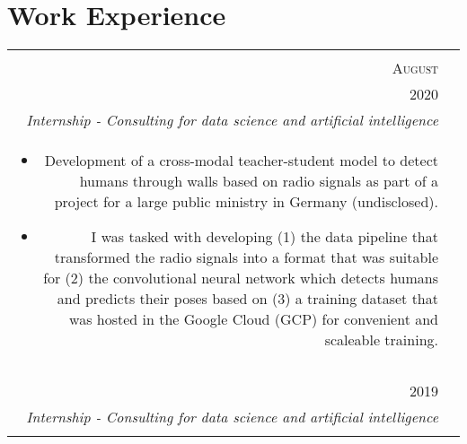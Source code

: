 \documentclass[a4paper,10pt]{article}
\begin{document}
\section{Work Experience}
\begin{tabularx}{\textwidth}{ r | X }

  \begin{tabular}{r}
      \textsc{July \&} \\
      \textsc{August} \\
      \textsc{2020}
  \end{tabular} &

  \begin{tabular}{p{}}
    \textsc{Atos} \\
    \emph{Internship - Consulting for data science and artificial intelligence} \\
    \vspace{-2mm}
    \begin{itemize}[leftmargin=*]

      \item Development of a cross-modal teacher-student model to detect
          humans through walls based on radio signals as part of a project for
          a large public ministry in Germany (undisclosed).

      \item I was tasked with developing (1) the data pipeline that
          transformed the radio signals into a format that was suitable for
          (2) the convolutional neural network which detects humans and
          predicts their poses based on (3) a training dataset that was hosted
          in the Google Cloud (GCP) for convenient and scaleable training.

    \end{itemize}
  \end{tabular}
  \vspace{-6mm} \\
  \multicolumn{2}{c}{} \\

  \begin{tabular}{r}
      \textsc{September} \\
      \textsc{2019}
  \end{tabular} &

  \begin{tabular}{p{}}
    \textsc{Atos} \\
    \emph{Internship - Consulting for data science and artificial intelligence} \\
    \vspace{-2mm}
    \begin{itemize}[leftmargin=*]


\end{itemize}
\end{tabular}
\end{tabularx}
\end{document}
